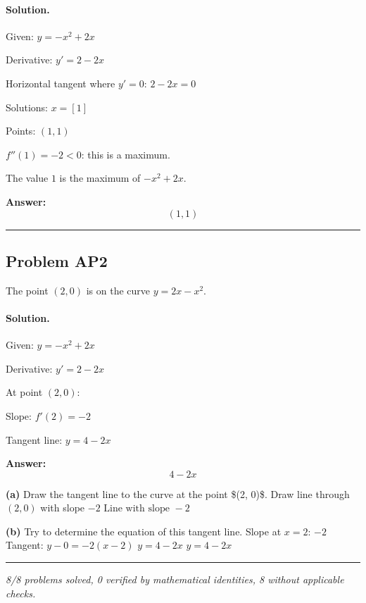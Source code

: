 \documentclass[12pt, a4paper]{article}
\newcommand{\problem}[1]{\subsection*{Problem #1}}
\newcommand{\solution}{\paragraph{Solution.}}
\begin{document}
\solution

Given: $y = - x^{2} + 2 x$

Derivative: $y' = 2 - 2 x$

Horizontal tangent where $y' = 0$: $2 - 2 x = 0$

Solutions: $x = \left[ 1\right]$

Points: $(1, 1)$

$f''(1) = -2 < 0$: this is a maximum.

The value $1$ is the maximum of $- x^{2} + 2 x$.

\textbf{Answer:}
\[(1, 1)\]

\vspace{1em}
\hrule
\vspace{1em}

\problem{AP2}

The point $(2, 0)$ is on the curve $y = 2x - x^2$.

\solution

Given: $y = - x^{2} + 2 x$

Derivative: $y' = 2 - 2 x$

At point $(2, 0)$:

Slope: $f'(2) = -2$

Tangent line: $y = 4 - 2 x$

\textbf{Answer:}
\[4 - 2 x\]

\textbf{(a)}
Draw the tangent line to the curve at the point \$(2, 0)\$.
Draw line through $(2, 0)$ with slope $-2$
$\boxed{\text{Line with slope } -2}$

\textbf{(b)}
Try to determine the equation of this tangent line.
Slope at $x=2$: $-2$
Tangent: $y - 0 = -2(x - 2)$
$y = 4 - 2 x$
$\boxed{y = 4 - 2 x}$

\vspace{1em}
\hrule
\vspace{1em}

\vspace{2em}
\noindent\textit{8/8 problems solved, 0 verified by mathematical identities, 8 without applicable checks.}
\end{document}

